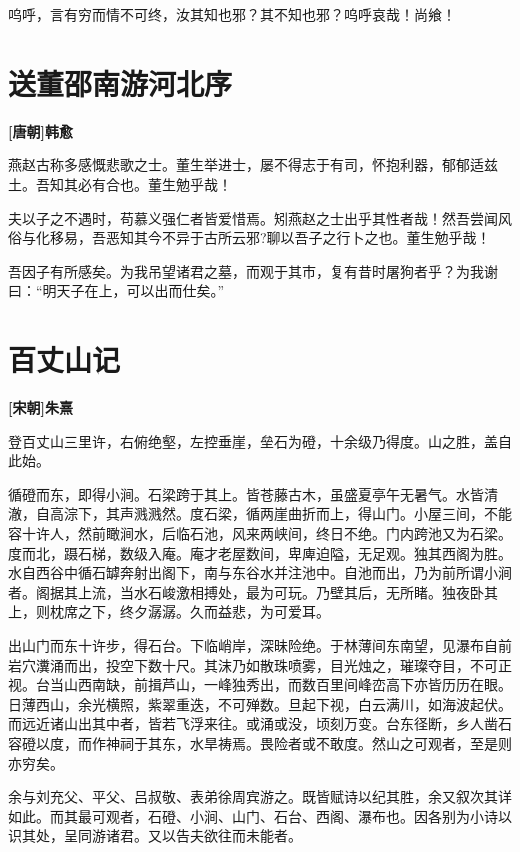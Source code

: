 \documentclass[UTF8,titlepage,oneside]{ctexbook}
\begin{document}
呜呼，言有穷而情不可终，汝其知也邪？其不知也邪？呜呼哀哉！尚飨！


\chapter*{送董邵南游河北序}
\begin{center}
	\textbf{[唐朝]韩愈}
\end{center}

燕赵古称多感慨悲歌之士。董生举进士，屡不得志于有司，怀抱利器，郁郁适兹土。吾知其必有合也。董生勉乎哉！

夫以子之不遇时，苟慕义强仁者皆爱惜焉。矧燕赵之士出乎其性者哉！然吾尝闻风俗与化移易，吾恶知其今不异于古所云邪?聊以吾子之行卜之也。董生勉乎哉！

吾因子有所感矣。为我吊望诸君之墓，而观于其市，复有昔时屠狗者乎？为我谢曰：“明天子在上，可以出而仕矣。”


\chapter*{百丈山记}
\begin{center}
	\textbf{[宋朝]朱熹}
\end{center}


登百丈山三里许，右俯绝壑，左控垂崖，垒石为磴，十余级乃得度。山之胜，盖自此始。


循磴而东，即得小涧。石梁跨于其上。皆苍藤古木，虽盛夏亭午无暑气。水皆清澈，自高淙下，其声溅溅然。度石梁，循两崖曲折而上，得山门。小屋三间，不能容十许人，然前瞰涧水，后临石池，风来两峡间，终日不绝。门内跨池又为石梁。度而北，蹑石梯，数级入庵。庵才老屋数间，卑庳迫隘，无足观。独其西阁为胜。水自西谷中循石罅奔射出阁下，南与东谷水并注池中。自池而出，乃为前所谓小涧者。阁据其上流，当水石峻激相搏处，最为可玩。乃壁其后，无所睹。独夜卧其上，则枕席之下，终夕潺潺。久而益悲，为可爱耳。


出山门而东十许步，得石台。下临峭岸，深昧险绝。于林薄间东南望，见瀑布自前岩穴瀵涌而出，投空下数十尺。其沫乃如散珠喷雾，目光烛之，璀璨夺目，不可正视。台当山西南缺，前揖芦山，一峰独秀出，而数百里间峰峦高下亦皆历历在眼。日薄西山，余光横照，紫翠重迭，不可殚数。旦起下视，白云满川，如海波起伏。而远近诸山出其中者，皆若飞浮来往。或涌或没，顷刻万变。台东径断，乡人凿石容磴以度，而作神祠于其东，水旱祷焉。畏险者或不敢度。然山之可观者，至是则亦穷矣。


余与刘充父、平父、吕叔敬、表弟徐周宾游之。既皆赋诗以纪其胜，余又叙次其详如此。而其最可观者，石磴、小涧、山门、石台、西阁、瀑布也。因各别为小诗以识其处，呈同游诸君。又以告夫欲往而未能者。
\end{document}
